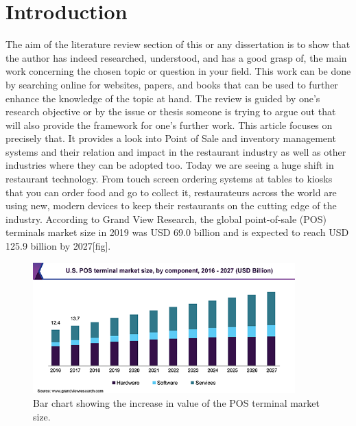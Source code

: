 

\section{Introduction}
The aim of the literature review section of this or any dissertation is to show that the author has indeed researched, understood, and has a good grasp of, the main work concerning the chosen topic or question in your field. This work can be done by searching online for websites, papers, and books that can be used to further enhance the knowledge of the topic at hand. The review is guided by one’s research objective or by the issue or thesis someone is trying to argue out that will also provide the framework for one’s further work. 
\newline
\newline
This article focuses on precisely that. It provides a look into Point of Sale and inventory management systems and their relation and impact in the restaurant industry as well as other industries where they can be adopted too.
\newline
\newline
Today we are seeing a huge shift in restaurant technology. From touch screen ordering systems at tables to kiosks that you can order food and go to collect it, restaurateurs across the world are using new, modern devices to keep their restaurants on the cutting edge of the industry. According to Grand View Research, the global point-of-sale (POS) terminals market size in 2019 was USD  69.0 billion and is expected to reach USD 125.9 billion by 2027[fig].

\begin{figure}[h!]
	\caption{Bar chart showing the increase in value of the POS terminal market size.}
	\label{image:myImageName}
	\centering
	\includegraphics[width=0.9\textwidth]{Fig images/us-pos-terminal-market.png}
\end{figure}


